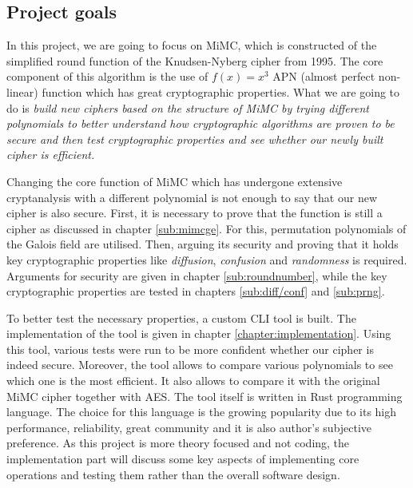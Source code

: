 \documentclass{Resources/UoBLab1}
\theoremstyle{definition}
\begin{document}
\subsection{Project goals}\label{sub:goals}
In this project, we are going to focus on MiMC, which is constructed of the simplified round function of the Knudsen-Nyberg cipher from 1995\cite{KNCipher}. The core component of this algorithm is the use of \(f(x)=x^3\) APN (almost perfect non-linear) function which has great cryptographic properties\cite{APN}. What we are going to do is \textit{build new ciphers based on the structure of MiMC by trying different polynomials to better understand how cryptographic algorithms are proven to be secure and then test cryptographic properties and see whether our newly built cipher is efficient.}

Changing the core function of MiMC which has undergone extensive cryptanalysis with a different polynomial is not enough to say that our new cipher is also secure. First, it is necessary to prove that the function is still a cipher as discussed in chapter \ref{sub:mimcge}. For this, permutation polynomials of the Galois field are utilised. Then, arguing its security and proving that it holds key cryptographic properties like \textit{diffusion}, \textit{confusion} and \textit{randomness} is required. Arguments for security are given in chapter \ref{sub:roundnumber}, while the key cryptographic properties are tested in chapters \ref{sub:diff/conf} and \ref{sub:prng}.

To better test the necessary properties, a custom CLI tool is built. The implementation of the tool is given in chapter \ref{chapter:implementation}. Using this tool, various tests were run to be more confident whether our cipher is indeed secure. Moreover, the tool allows to compare various polynomials to see which one is the most efficient. It also allows to compare it with the original MiMC cipher together with AES. The tool itself is written in Rust programming language. The choice for this language is the growing popularity due to its high performance, reliability, great community and it is also author's subjective preference. As this project is more theory focused and not coding, the implementation part will discuss some key aspects of implementing core operations and testing them rather than the overall software design.


\end{document}
